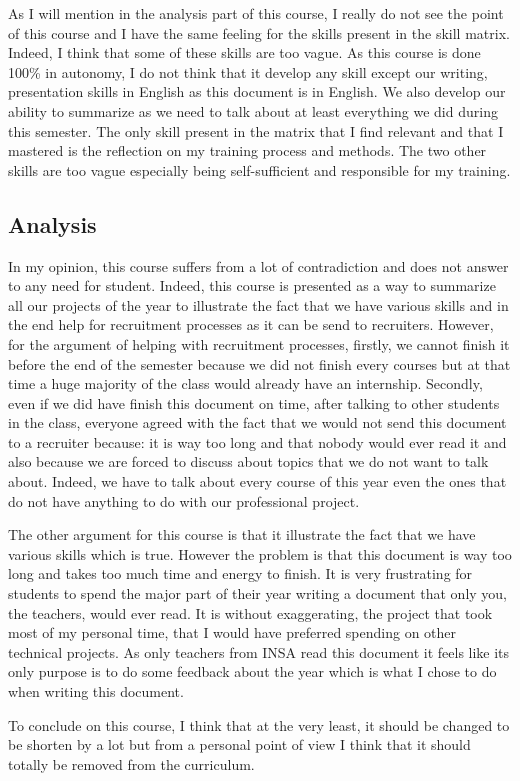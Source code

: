 As I will mention in the analysis part of this course, I really do not see the point of this course and I have the same feeling for the skills present in the skill matrix. Indeed, I think that some of these skills are too vague. As this course is done 100\% in autonomy, I do not think that it develop any skill except our writing, presentation skills in English as this document is in English. We also develop our ability to summarize as we need to talk about at least everything we did during this semester. The only skill present in the matrix that I find relevant and that I mastered is the reflection on my training process and methods. The two other skills are too vague especially being self-sufficient and responsible for my training. 

\subsection{Analysis}

In my opinion, this course suffers from a lot of contradiction and does not answer to any need for student. Indeed, this course is presented as a way to summarize all our projects of the year to illustrate the fact that we have various skills and in the end help for recruitment processes as it can be send to recruiters. However, for the argument of helping with recruitment processes, firstly, we cannot finish it before the end of the semester because we did not finish every courses but at that time a huge majority of the class would already have an internship. Secondly, even if we did have finish this document on time, after talking to other students in the class, everyone agreed with the fact that we would not send this document to a recruiter because: it is way too long and that nobody would ever read it and also because we are forced to discuss about topics that we do not want to talk about. Indeed, we have to talk about every course of this year even the ones that do not have anything to do with our professional project. 
\\\par
The other argument for this course is that it illustrate the fact that we have various skills which is true. However the problem is that this document is way too long and takes too much time and energy to finish. It is very frustrating for students to spend the major part of their year writing a document that only you, the teachers, would ever read. It is without exaggerating, the project that took most of my personal time, that I would have preferred spending on other technical projects. 
As only teachers from INSA read this document it feels like its only  purpose is to do some feedback about the year which is what I chose to do when writing this document. 
\\\par
To conclude on this course, I think that at the very least, it should be changed to be shorten by a lot but from a personal point of view I think that it should totally be removed from the curriculum.